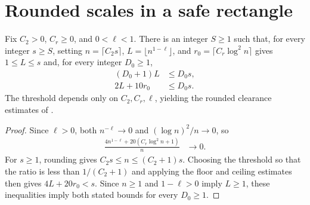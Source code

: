 \section{Rounded scales in a safe rectangle}

\begin{lemma}
    \label{thm:area_law_rounded_clearance}
    \leanok
    Fix $C_2>0$, $C_r\ge0$, and $0<\ell<1$. There is an integer $S\ge1$
    such that, for every integer $s\ge S$, setting
    $n=\lceil C_2s\rceil$, $L=\lfloor n^{1-\ell}\rfloor$, and
    $r_0=\lceil C_r\log^2n\rceil$ gives $1\le L\le s$ and, for every
    integer $D_0\ge1$,
    \begin{align}
        (D_0+1)L & \le D_0s, \\
        2L+10r_0 & \le D_0s.
    \end{align}
    The threshold depends only on $C_2,C_r,\ell$, yielding the rounded
    clearance estimates of
    \cite[proof of Proposition~9.5, lines~707--729]{OpenAI2026AreaLaw}.
\end{lemma}
\begin{proof}\leanok
    Since $\ell>0$, both $n^{-\ell}\to0$ and $(\log n)^2/n\to0$, so
    \begin{align}
        \frac{4n^{1-\ell}+20(C_r\log^2n+1)}{n} & \longrightarrow0.
    \end{align}
    For $s\ge1$, rounding gives $C_2s\le n\le(C_2+1)s$.
    Choosing the threshold so that the ratio is less than $1/(C_2+1)$
    and applying the floor and ceiling estimates then gives $4L+20r_0<s$.
    Since $n\ge1$ and $1-\ell>0$ imply $L\ge1$, these inequalities imply
    both stated bounds for every $D_0\ge1$.
\end{proof}

